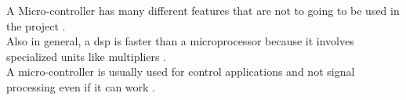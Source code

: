 A Micro-controller has many different features that are not to going to be used in the project \citep{diffbet} \citep{esp_simone}. \\

Also in general, a \gls{dsp} is faster than a microprocessor because it involves specialized units like multipliers \citep{diffbet2}. \\

A micro-controller is usually used for control applications and not signal processing even if it can work \citep{tex_dsp}.\\ 











